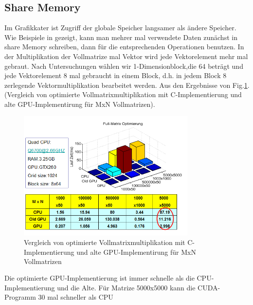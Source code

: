 \subsection{Share Memory}
Im Grafikkater ist Zugriff der globale Speicher langsamer als ändere Speicher.  Wie Beispiele in \cite{cudapg} gezeigt, kann man mehrer mal verwendete Daten zunächst in share Memory schreiben, dann für die entsprechenden Operationen benutzen. In der Multiplikation der Vollmatrize mal Vektor wird jede Vektorelement mehr mal gebraut. Nach Untersuchungen wählen wir 1-Dimensionblock,die 64 beträgt und jede Vektorelement 8 mal gebraucht in einem Block, d.h. in jedem Block 8 zerlegende Vektormultiplikation bearbeitet werden. Aus den Ergebnisse von Fig.\ref{sharememory}.(Vergleich von optimierte Vollmatrixmultiplikation mit C-Implementierung und alte GPU-Implementirung für MxN Vollmatrizen).
\begin{figure}[htbp]
\includegraphics[width=3.5in]{../xby/pic/sharememory}
\caption{Vergleich von optimierte Vollmatrixmultiplikation mit C-Implementierung und alte GPU-Implementirung für MxN Vollmatrizen}
\label{sharememory}
\end{figure}

Die optimierte GPU-Implementierung ist immer schnelle als die CPU-Implementierung  und die Alte. Für Matrize 5000x5000 kann die CUDA-Programm 30 mal schneller als CPU

